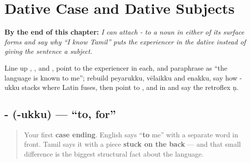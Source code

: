 
\chapter{Dative Case and Dative Subjects}
\label{ch:ta-dative-case}

\begin{chapteropening}
\textbf{By the end of this chapter:} \emph{I can attach - to a noun in either of its surface forms and say why \textquotedblleft{}I know Tamil\textquotedblright{} puts the experiencer in the dative instead of giving the sentence a subject.}

Line up , ,  and , point to the experiencer in each, and paraphrase    as \textquotedblleft{}the language is known to me\textquotedblright{}; rebuild peyarukku, vēlaikku and enakku, say how -ukku stacks where Latin fuses, then point to ,  and  in  and say the retroflex ṇ.
\end{chapteropening}

\section[\texorpdfstring{-\ta{உக்கு} (-ukku)}{-உக்கு (-ukku)}]{- (-ukku) — \textquotedblleft{}to, for\textquotedblright{}}

\label{lesson:TA-C06-dative-ukku}



\begin{quote}
Your first \textbf{case ending}. English says \textquotedblleft{}\textbf{to} me\textquotedblright{} with a separate word in front. Tamil says it with a piece \textbf{stuck on the back} — and that small difference is the biggest structural fact about the language.
\end{quote}

